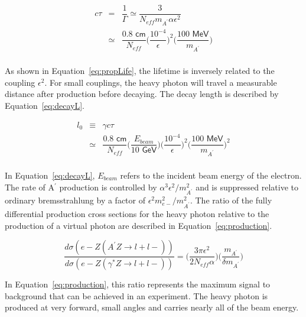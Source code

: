 \begin{eqnarray}
	\label{eq:propLife}
	c\tau &=& \dfrac{1}{\Gamma}\simeq \dfrac{3}{N_{eff}m_{A^{\prime}}\alpha\epsilon^2}\\
	&\simeq & \dfrac{0.8\textsf{ cm}}{N_{eff}}\Big({\dfrac{10^{-4}}{\epsilon}}\Big)^2\Big(\dfrac{100\textsf{ MeV}}{m_{A^{\prime}}}\Big)\\
\end{eqnarray}

As shown in Equation~\eqref{eq:propLife}, the lifetime is inversely related to the coupling $\epsilon^2$. For small couplings, the heavy photon will travel a measurable distance after production before decaying. The decay length is described by Equation~\eqref{eq:decayL}.

\begin{eqnarray}
	\label{eq:decayL}
	l_0 &\equiv &\gamma c \tau \\
	&\simeq & \dfrac{0.8\textsf{ cm}}{N_{eff}}\Big(\dfrac{E_{beam}}{10\textsf{ GeV}}\Big)\Big({\dfrac{10^{-4}}{\epsilon}}\Big)^2\Big(\dfrac{100\textsf{ MeV}}{m_{A^{\prime}}}\Big)^2\\
\end{eqnarray}

In Equation~\eqref{eq:decayL}, $E_{beam}$ refers to the incident beam energy of the electron. The rate of A$^{\prime}$ production is controlled by $\alpha^3\epsilon^2/m_{A^{\prime}}^2$ and is suppressed relative to ordinary bremsstrahlung by a factor of $\epsilon^2m_{e-}^2/m_{A^{\prime}}^2$. The ratio of the fully differential production cross sections for the heavy photon relative to the production of a virtual photon are described in Equation~\eqref{eq:production}.

\begin{equation}
	\label{eq:production}
	\dfrac{d\sigma(e-Z(A^{\prime}Z\rightarrow l+l-))}{d\sigma(e-Z(\gamma^{\ast}Z\rightarrow l+l-))} = \Big(\dfrac{3\pi\epsilon^2}{2N_{eff}\alpha}\Big) \Big(\dfrac{m_{A^{\prime}}}{\delta m_{A^{\prime}}}\Big)
\end{equation}

In Equation~\eqref{eq:production}, this ratio represents the maximum signal to background that can be achieved in an experiment. The heavy photon is produced at very forward, small angles and carries nearly all of the beam energy. \\

